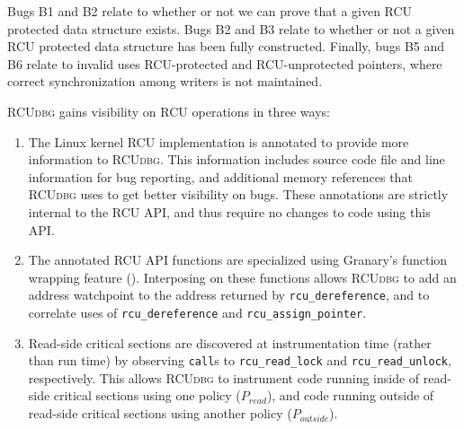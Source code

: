 \documentclass[preprint]{sigplanconf}
\newcommand{\toolname}[1]{{\scshape #1}}
\begin{document}
Bugs B1 and B2 relate to whether or not we can prove that a given RCU protected data structure exists. Bugs B2 and B3 relate to whether or not a given RCU protected data structure has been fully constructed. Finally, bugs B5 and B6 relate to invalid uses RCU-protected and RCU-unprotected pointers, where correct synchronization among writers is not maintained.



\toolname{RCUdbg} gains visibility on RCU operations in three ways: \begin{enumerate}
	\item The Linux kernel RCU implementation is annotated to provide more information to \toolname{RCUdbg}. This information includes source code file and line information for bug reporting, and additional memory references that \toolname{RCUdbg} uses to get better visibility on bugs. These annotations are strictly internal to the RCU API, and thus require no changes to code using this API.
	\item The annotated RCU API functions are specialized using Granary's function wrapping feature (). Interposing on these functions allows \toolname{RCUdbg} to add an address watchpoint to the address returned by \texttt{rcu\_\linebreak[0]dereference}, and to correlate uses of \texttt{rcu\_\linebreak[0]dereference} and \texttt{rcu\_\linebreak[0]assign\_\linebreak[0]pointer}.
	\item Read-side critical sections are discovered at instrumentation time (rather than run time) by observing \texttt{call}s to \texttt{rcu\_\linebreak[0]read\_\linebreak[0]lock} and \texttt{rcu\_\linebreak[0]read\_\linebreak[0]unlock}, respectively. This allows \toolname{RCUdbg} to instrument code running inside of read-side critical sections using one policy ($P_{read}$), and code running outside of read-side critical sections using another policy ($P_{outside}$).
\end{enumerate}
\end{document}
